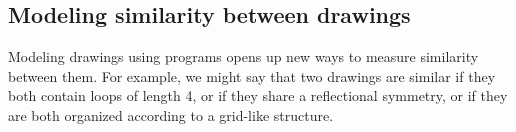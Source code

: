 \documentclass{article}
\begin{document}


\subsection{Modeling similarity between drawings}
Modeling drawings using programs opens up new ways to measure similarity between them.
For example, we might say that two drawings are similar if they both contain loops of length 4,
or if they share a reflectional symmetry,
or if they are both organized according to a grid-like structure.
\end{document}
